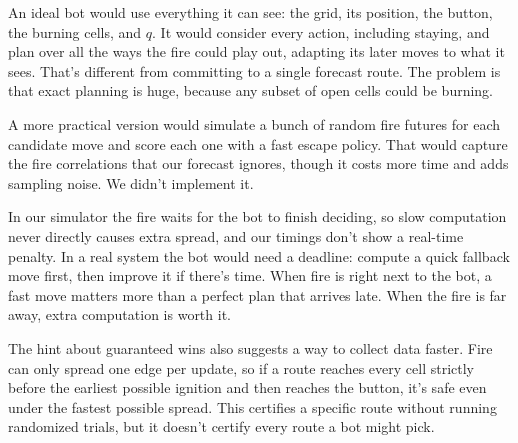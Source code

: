 \documentclass[11pt]{article}
\begin{document}
An ideal bot would use everything it can see: the grid, its position, the button, the burning cells, and $q$. It would consider every action, including staying, and plan over all the ways the fire could play out, adapting its later moves to what it sees. That's different from committing to a single forecast route. The problem is that exact planning is huge, because any subset of open cells could be burning.

A more practical version would simulate a bunch of random fire futures for each candidate move and score each one with a fast escape policy. That would capture the fire correlations that our forecast ignores, though it costs more time and adds sampling noise. We didn't implement it.

In our simulator the fire waits for the bot to finish deciding, so slow computation never directly causes extra spread, and our timings don't show a real-time penalty. In a real system the bot would need a deadline: compute a quick fallback move first, then improve it if there's time. When fire is right next to the bot, a fast move matters more than a perfect plan that arrives late. When the fire is far away, extra computation is worth it.

The hint about guaranteed wins also suggests a way to collect data faster. Fire can only spread one edge per update, so if a route reaches every cell strictly before the earliest possible ignition and then reaches the button, it's safe even under the fastest possible spread. This certifies a specific route without running randomized trials, but it doesn't certify every route a bot might pick.
\end{document}

